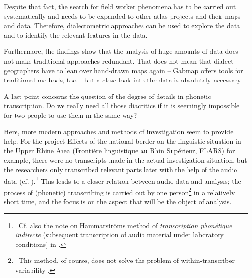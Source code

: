 \documentclass[output=paper]{LSP/langsci}
\begin{document}
Despite that fact, the search for field worker phenomena has to be carried out systematically and needs to be expanded to other atlas projects and their maps and data. Therefore, dialectometric approaches can be used to explore the data and to identify the relevant features in the data.

Furthermore, the findings show that the analysis of huge amounts of data does not make traditional approaches redundant. That does not mean that dialect geographers have to lean over hand-drawn maps again – Gabmap offers tools for {\textquotedbl}traditional{\textquotedbl} methods, too – but a close look into the data is absolutely necessary.

A last point concerns the question of the degree of details in phonetic transcription. Do we really need all those diacritics if it is seemingly impossible for two people to use them in the same way?

Here, more modern approaches and methods of investigation seem to provide help. For the project {\textquotedbl}Effects of the national border on the linguistic situation in the Upper Rhine Area{\textquotedbl} (Frontière linguistique au Rhin Supérieur, FLARS) for example, there were no transcripts made in the actual investigation situation, but the researchers only transcribed relevant parts later with the help of the audio data (cf. \citealt{auer_auswirkungen_2015}).\footnote{\ Cf. also the note on Hammarström{\textquotesingle}s method of \textit{transcription phonétique indirecte} ({\textquotesingle}subsequent transcription of audio material under laboratory conditions{\textquotesingle}) in \citet[73]{hotzenkocherle_einfuhrung_1962}.} This leads to a closer relation between audio data and analysis; the process of (phonetic) transcribing is carried out by one person\footnote{\ This method, of course, does not solve the problem of {\textquotedbl}within-transcriber variability{\textquotedbl} \citep[258]{kerswill_limits_1990}.} in a relatively short time, and the focus is on the aspect that will be the object of analysis.

\printbibliography[heading=subbibliography,notkeyword=this]
\end{document}
